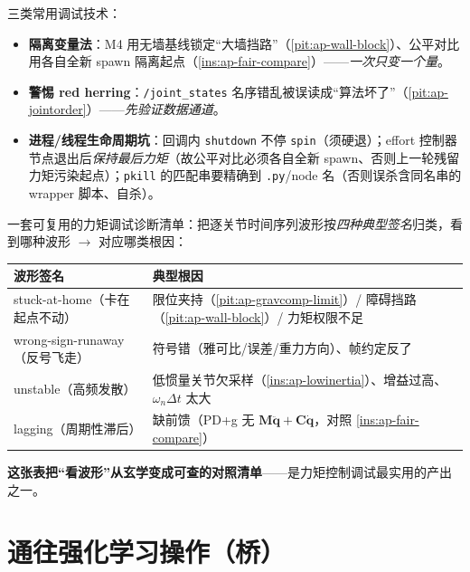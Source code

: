 \begin{insight}\label{ins:ap-techniques}
三类常用调试技术：
\begin{itemize}
  \item \textbf{隔离变量法}：M4 用无墙基线锁定“大墙挡路”（\cref{pit:ap-wall-block}）、公平对比用各自全新 spawn 隔离起点（\cref{ins:ap-fair-compare}）——\emph{一次只变一个量}。
  \item \textbf{警惕 red herring}：\texttt{/\allowbreak joint\_states} 名序错乱被误读成“算法坏了”（\cref{pit:ap-jointorder}）——\emph{先验证数据通道}。
  \item \textbf{进程/线程生命周期坑}：回调内 \texttt{shutdown} 不停 \texttt{spin}（须硬退）；effort 控制器节点退出后\emph{保持最后力矩}（故公平对比必须各自全新 spawn、否则上一轮残留力矩污染起点）；\texttt{pkill} 的匹配串要精确到 \texttt{.py}/node 名（否则误杀含同名串的 wrapper 脚本、自杀）。
\end{itemize}
\end{insight}

\begin{insight}[力矩跟踪故障的四种波形签名]\label{ins:ap-signatures}
一套可复用的力矩调试诊断清单：把逐关节时间序列波形按\emph{四种典型签名}归类，看到哪种波形 $\to$ 对应哪类根因：
\begin{table}[H]\centering\small
\begin{tabular}{p{} p{}}
\toprule
波形签名 & 典型根因 \\
\midrule
stuck-at-home（卡在起点不动）& 限位夹持（\cref{pit:ap-gravcomp-limit}）/ 障碍挡路（\cref{pit:ap-wall-block}）/ 力矩权限不足 \\
wrong-sign-runaway（反号飞走）& 符号错（雅可比/误差/重力方向）、帧约定反了 \\
unstable（高频发散）& 低惯量关节欠采样（\cref{ins:ap-lowinertia}）、增益过高、$\omega_n\Delta t$ 太大 \\
lagging（周期性滞后）& 缺前馈（PD+g 无 $\mathbf{M}\ddot{\mathbf{q}}+\mathbf{C}\dot{\mathbf{q}}$，对照 \cref{ins:ap-fair-compare}）\\
\bottomrule
\end{tabular}
\label{tab:ap-signatures}
\end{table}
\textbf{这张表把“看波形”从玄学变成可查的对照清单}——是力矩控制调试最实用的产出之一。
\end{insight}

\section{通往强化学习操作（桥）}
\label{sec:ap-to-rl}

